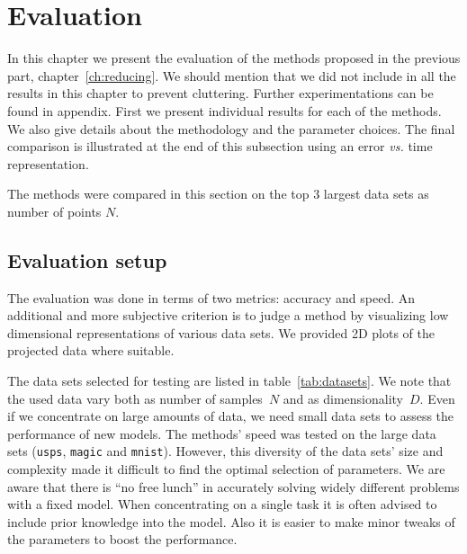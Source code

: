 \chapter{Evaluation}
\label{ch:evaluation}

In this chapter we present the evaluation of the methods proposed in the previous part, chapter~\ref{ch:reducing}. We should mention that we did not include in all the results in this chapter to prevent cluttering. Further experimentations can be found in appendix. First we present individual results for each of the methods. We also give details about the methodology and the parameter choices. The final comparison is illustrated at the end of this subsection using an error \textit{vs.} time representation.

The methods were compared in this section on the top 3 largest data sets as number of points $N$.

\section{Evaluation setup}
\label{sec:setup}

The evaluation was done in terms of two metrics: accuracy and speed. An additional and more subjective criterion is to judge a method by visualizing low dimensional representations of various data sets. We provided 2D plots of the projected data where suitable.

The data sets selected for testing are listed in table~\ref{tab:datasets}. We note that the used data vary both as number of samples~$N$ and as dimensionality~$D$. Even if we concentrate on large amounts of data, we need small data sets to assess the performance of new models. The methods' speed was tested on the large data sets (\texttt{usps}, \texttt{magic} and \texttt{mnist}). However, this diversity of the data sets' size and complexity made it difficult to find the optimal selection of parameters. We are aware that there is ``no free lunch'' in accurately solving widely different problems with a fixed model. When concentrating on a single task it is often advised to include prior knowledge into the model. Also it is easier to make minor tweaks of the parameters to boost the performance.

